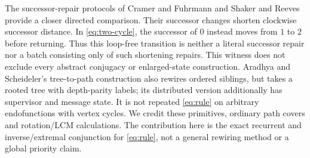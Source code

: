 The successor-repair protocols of Cramer and Fuhrmann
\citep[Sections~4 and 5.1--5.3]{cramer2005ring} and Shaker and Reeves
\citep[Figure~3 and Section~5.1]{shaker2005ring} provide a closer directed
comparison. Their successor changes shorten clockwise successor distance.
In \eqref{eq:two-cycle}, the successor of $0$ instead moves from $1$ to
$2$ before returning. Thus this loop-free transition is neither a literal
successor repair nor a batch consisting only of such shortening repairs.
This witness does not exclude every abstract conjugacy or enlarged-state
construction. Aradhya and Scheideler's tree-to-path construction
\citep[Section~3.4, Algorithm~10 and Appendix~B]{aradhya2025tree}
also rewires ordered siblings, but takes a rooted tree with depth-parity
labels; its distributed version additionally has supervisor and message
state. It is not repeated \eqref{eq:rule} on arbitrary endofunctions with
vertex cycles. We credit these primitives, ordinary path covers and
rotation/LCM calculations. The contribution here is the exact recurrent
and inverse/extremal conjunction for \eqref{eq:rule}, not a general
rewiring method or a global priority claim.
